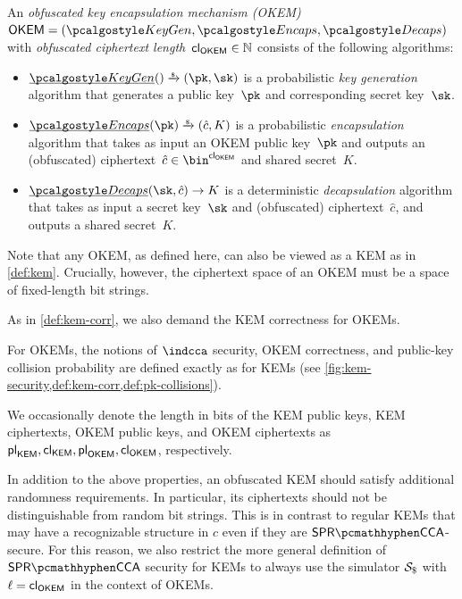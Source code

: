 \begin{definition}
    \label{def:okem}
    An \emph{obfuscated key encapsulation mechanism (OKEM)} $\OKEM = (\kgen, \encaps, \decaps)$ with \emph{obfuscated ciphertext length}~${\mathsf{cl}_{\mathsf{OKEM}}} \in \mathbb{N}$ consists of the following algorithms:
    \begin{itemize}
        \item $\ul{\kgen}() \tor (\pk,\sk)$ is a probabilistic \emph{key generation} algorithm that generates a public key~$\pk$ and corresponding secret key~$\sk$.

        \item $\ul{\encaps}(\pk) \tor (\hat c, K)$ is a probabilistic \emph{encapsulation} algorithm that takes as input an OKEM public key~$\pk$ and outputs an (obfuscated) ciphertext~$\hat c \in \bin^\obfctxtlen$ and shared secret~$K$.

        \item $\ul{\decaps}(\sk,\hat c) \to K$ is a deterministic \emph{decapsulation} algorithm that takes as input a secret key~$\sk$ and (obfuscated) ciphertext~$\hat c$, and outputs a shared secret~$K$.
    \end{itemize}
    Note that any OKEM, as defined here, can also be viewed as a KEM as in \cref{def:kem}. Crucially, however, the ciphertext space of an OKEM must be a space of fixed-length bit strings.

    As in \cref{def:kem-corr}, we also demand the KEM correctness for OKEMs.
\end{definition}

For OKEMs, the notions of $\indcca$ security, OKEM correctness, and public-key collision probability are defined exactly as for KEMs (see \cref{fig:kem-security,def:kem-corr,def:pk-collisions}).

We occasionally denote the length in bits of the KEM public keys, KEM ciphertexts, OKEM public keys, and OKEM ciphertexts as ${\mathsf{pl}_{\mathsf{KEM}}}, {\mathsf{cl}_{\mathsf{KEM}}}, {\mathsf{pl}_{\mathsf{OKEM}}}, {\mathsf{cl}_{\mathsf{OKEM}}}$, respectively.

In addition to the above properties, an obfuscated KEM should satisfy additional randomness requirements. In particular, its ciphertexts should not be distinguishable from random bit strings. This is in contrast to regular KEMs that may have a recognizable structure in $c$ even if they are $\sprcca$-secure.
For this reason, we also restrict the more general definition of $\sprcca$ security for KEMs to always use the simulator $\simulbin$ with $\ell = {\mathsf{cl}_{\mathsf{OKEM}}}$ in the context of OKEMs.

